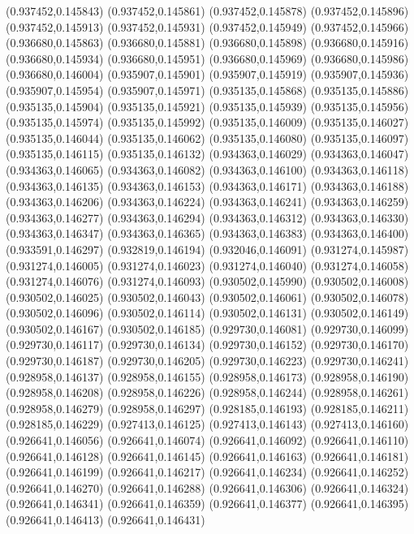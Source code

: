 (0.937452,0.145843)
(0.937452,0.145861)
(0.937452,0.145878)
(0.937452,0.145896)
(0.937452,0.145913)
(0.937452,0.145931)
(0.937452,0.145949)
(0.937452,0.145966)
(0.936680,0.145863)
(0.936680,0.145881)
(0.936680,0.145898)
(0.936680,0.145916)
(0.936680,0.145934)
(0.936680,0.145951)
(0.936680,0.145969)
(0.936680,0.145986)
(0.936680,0.146004)
(0.935907,0.145901)
(0.935907,0.145919)
(0.935907,0.145936)
(0.935907,0.145954)
(0.935907,0.145971)
(0.935135,0.145868)
(0.935135,0.145886)
(0.935135,0.145904)
(0.935135,0.145921)
(0.935135,0.145939)
(0.935135,0.145956)
(0.935135,0.145974)
(0.935135,0.145992)
(0.935135,0.146009)
(0.935135,0.146027)
(0.935135,0.146044)
(0.935135,0.146062)
(0.935135,0.146080)
(0.935135,0.146097)
(0.935135,0.146115)
(0.935135,0.146132)
(0.934363,0.146029)
(0.934363,0.146047)
(0.934363,0.146065)
(0.934363,0.146082)
(0.934363,0.146100)
(0.934363,0.146118)
(0.934363,0.146135)
(0.934363,0.146153)
(0.934363,0.146171)
(0.934363,0.146188)
(0.934363,0.146206)
(0.934363,0.146224)
(0.934363,0.146241)
(0.934363,0.146259)
(0.934363,0.146277)
(0.934363,0.146294)
(0.934363,0.146312)
(0.934363,0.146330)
(0.934363,0.146347)
(0.934363,0.146365)
(0.934363,0.146383)
(0.934363,0.146400)
(0.933591,0.146297)
(0.932819,0.146194)
(0.932046,0.146091)
(0.931274,0.145987)
(0.931274,0.146005)
(0.931274,0.146023)
(0.931274,0.146040)
(0.931274,0.146058)
(0.931274,0.146076)
(0.931274,0.146093)
(0.930502,0.145990)
(0.930502,0.146008)
(0.930502,0.146025)
(0.930502,0.146043)
(0.930502,0.146061)
(0.930502,0.146078)
(0.930502,0.146096)
(0.930502,0.146114)
(0.930502,0.146131)
(0.930502,0.146149)
(0.930502,0.146167)
(0.930502,0.146185)
(0.929730,0.146081)
(0.929730,0.146099)
(0.929730,0.146117)
(0.929730,0.146134)
(0.929730,0.146152)
(0.929730,0.146170)
(0.929730,0.146187)
(0.929730,0.146205)
(0.929730,0.146223)
(0.929730,0.146241)
(0.928958,0.146137)
(0.928958,0.146155)
(0.928958,0.146173)
(0.928958,0.146190)
(0.928958,0.146208)
(0.928958,0.146226)
(0.928958,0.146244)
(0.928958,0.146261)
(0.928958,0.146279)
(0.928958,0.146297)
(0.928185,0.146193)
(0.928185,0.146211)
(0.928185,0.146229)
(0.927413,0.146125)
(0.927413,0.146143)
(0.927413,0.146160)
(0.926641,0.146056)
(0.926641,0.146074)
(0.926641,0.146092)
(0.926641,0.146110)
(0.926641,0.146128)
(0.926641,0.146145)
(0.926641,0.146163)
(0.926641,0.146181)
(0.926641,0.146199)
(0.926641,0.146217)
(0.926641,0.146234)
(0.926641,0.146252)
(0.926641,0.146270)
(0.926641,0.146288)
(0.926641,0.146306)
(0.926641,0.146324)
(0.926641,0.146341)
(0.926641,0.146359)
(0.926641,0.146377)
(0.926641,0.146395)
(0.926641,0.146413)
(0.926641,0.146431)
